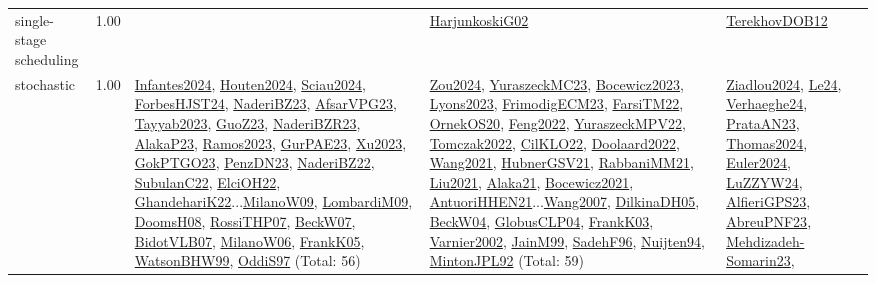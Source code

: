 {\begin{longtable}{p{3cm}r>{\raggedright\arraybackslash}p{6cm}>{\raggedright\arraybackslash}p{6cm}>{\raggedright\arraybackslash}p{8cm}}
\index{single-stage scheduling}\index{Concepts!single-stage scheduling}single-stage scheduling &  1.00 &  & \hyperref[detail:HarjunkoskiG02]{HarjunkoskiG02} & \hyperref[detail:TerekhovDOB12]{TerekhovDOB12}\\
\index{stochastic}\index{Concepts!stochastic}stochastic &  1.00 & \hyperref[detail:Infantes2024]{Infantes2024}, \hyperref[detail:Houten2024]{Houten2024}, \hyperref[detail:Sciau2024]{Sciau2024}, \hyperref[detail:ForbesHJST24]{ForbesHJST24}, \hyperref[detail:NaderiBZ23]{NaderiBZ23}, \hyperref[detail:AfsarVPG23]{AfsarVPG23}, \hyperref[detail:Tayyab2023]{Tayyab2023}, \hyperref[detail:GuoZ23]{GuoZ23}, \hyperref[detail:NaderiBZR23]{NaderiBZR23}, \hyperref[detail:AlakaP23]{AlakaP23}, \hyperref[detail:Ramos2023]{Ramos2023}, \hyperref[detail:GurPAE23]{GurPAE23}, \hyperref[detail:Xu2023]{Xu2023}, \hyperref[detail:GokPTGO23]{GokPTGO23}, \hyperref[detail:PenzDN23]{PenzDN23}, \hyperref[detail:NaderiBZ22]{NaderiBZ22}, \hyperref[detail:SubulanC22]{SubulanC22}, \hyperref[detail:ElciOH22]{ElciOH22}, \hyperref[detail:GhandehariK22]{GhandehariK22}...\hyperref[detail:MilanoW09]{MilanoW09}, \hyperref[detail:LombardiM09]{LombardiM09}, \hyperref[detail:DoomsH08]{DoomsH08}, \hyperref[detail:RossiTHP07]{RossiTHP07}, \hyperref[detail:BeckW07]{BeckW07}, \hyperref[detail:BidotVLB07]{BidotVLB07}, \hyperref[detail:MilanoW06]{MilanoW06}, \hyperref[detail:FrankK05]{FrankK05}, \hyperref[detail:WatsonBHW99]{WatsonBHW99}, \hyperref[detail:OddiS97]{OddiS97} (Total: 56) & \hyperref[detail:Zou2024]{Zou2024}, \hyperref[detail:YuraszeckMC23]{YuraszeckMC23}, \hyperref[detail:Bocewicz2023]{Bocewicz2023}, \hyperref[detail:Lyons2023]{Lyons2023}, \hyperref[detail:FrimodigECM23]{FrimodigECM23}, \hyperref[detail:FarsiTM22]{FarsiTM22}, \hyperref[detail:OrnekOS20]{OrnekOS20}, \hyperref[detail:Feng2022]{Feng2022}, \hyperref[detail:YuraszeckMPV22]{YuraszeckMPV22}, \hyperref[detail:Tomczak2022]{Tomczak2022}, \hyperref[detail:CilKLO22]{CilKLO22}, \hyperref[detail:Doolaard2022]{Doolaard2022}, \hyperref[detail:Wang2021]{Wang2021}, \hyperref[detail:HubnerGSV21]{HubnerGSV21}, \hyperref[detail:RabbaniMM21]{RabbaniMM21}, \hyperref[detail:Liu2021]{Liu2021}, \hyperref[detail:Alaka21]{Alaka21}, \hyperref[detail:Bocewicz2021]{Bocewicz2021}, \hyperref[detail:AntuoriHHEN21]{AntuoriHHEN21}...\hyperref[detail:Wang2007]{Wang2007}, \hyperref[detail:DilkinaDH05]{DilkinaDH05}, \hyperref[detail:BeckW04]{BeckW04}, \hyperref[detail:GlobusCLP04]{GlobusCLP04}, \hyperref[detail:FrankK03]{FrankK03}, \hyperref[detail:Varnier2002]{Varnier2002}, \hyperref[detail:JainM99]{JainM99}, \hyperref[detail:SadehF96]{SadehF96}, \hyperref[detail:Nuijten94]{Nuijten94}, \hyperref[detail:MintonJPL92]{MintonJPL92} (Total: 59) & \hyperref[detail:Ziadlou2024]{Ziadlou2024}, \hyperref[detail:Le24]{Le24}, \hyperref[detail:Verhaeghe24]{Verhaeghe24}, \hyperref[detail:PrataAN23]{PrataAN23}, \hyperref[detail:Thomas2024]{Thomas2024}, \hyperref[detail:Euler2024]{Euler2024}, \hyperref[detail:LuZZYW24]{LuZZYW24}, \hyperref[detail:AlfieriGPS23]{AlfieriGPS23}, \hyperref[detail:AbreuPNF23]{AbreuPNF23}, \hyperref[detail:Mehdizadeh-Somarin23]{Mehdizadeh-Somarin23}, 
\end{longtable}}
